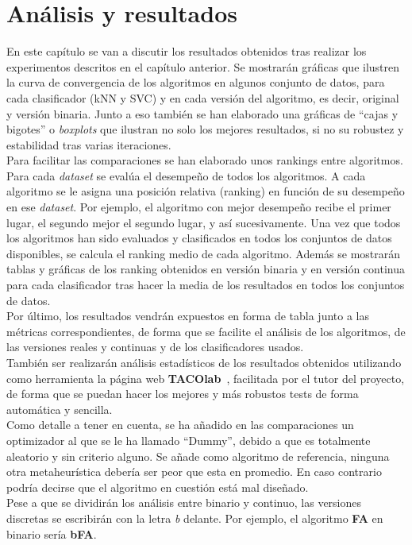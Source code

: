 \chapter{Análisis y resultados}
En este capítulo se van a discutir los resultados obtenidos tras realizar los experimentos descritos en el capítulo anterior. Se mostrarán gráficas que ilustren la curva de convergencia de los algoritmos en algunos conjunto de datos, para cada clasificador (kNN y SVC) y en cada versión del algoritmo, es decir, original y versión binaria. Junto a eso también se han elaborado una gráficas de ``cajas y bigotes'' o \textit{boxplots} que ilustran no solo los mejores resultados, si no su robustez y estabilidad tras varias iteraciones. \\[6pt]
Para facilitar las comparaciones se han elaborado unos rankings entre algoritmos. Para cada \textit{dataset} se evalúa el desempeño de todos los algoritmos. A cada algoritmo se le asigna una posición relativa (ranking) en función de su desempeño en ese \textit{dataset}. Por ejemplo, el algoritmo con mejor desempeño recibe el primer lugar, el segundo mejor el segundo lugar, y así sucesivamente. Una vez que todos los algoritmos han sido evaluados y clasificados en todos los conjuntos de datos disponibles, se calcula el ranking medio de cada algoritmo.
Además se mostrarán tablas y gráficas de los ranking obtenidos en versión binaria y en versión continua para cada clasificador tras hacer la media de los resultados en todos los conjuntos de datos.\\[6pt]
Por último, los resultados vendrán expuestos en forma de tabla junto a las métricas correspondientes, de forma que se facilite el análisis de los algoritmos, de las versiones reales y continuas y de los clasificadores usados.\\[6pt]
También ser realizarán análisis estadísticos de los resultados obtenidos utilizando como herramienta la página web \textbf{TACOlab}~\cite{taco_website}, facilitada por el tutor del proyecto, de forma que se puedan hacer los mejores y más robustos tests de forma automática y sencilla.\\[6pt]
Como detalle a tener en cuenta, se ha añadido en las comparaciones un optimizador al que se le ha llamado ``Dummy'', debido a que es totalmente aleatorio y sin criterio alguno. Se añade como algoritmo de referencia, ninguna otra metaheurística debería ser peor que esta en promedio. En caso contrario podría decirse que el algoritmo en cuestión está mal diseñado.\\[6pt]
Pese a que se dividirán los análisis entre binario y continuo, las versiones discretas se escribirán con la letra \textit{b} delante. Por ejemplo, el algoritmo \textbf{FA} en binario sería \textbf{bFA}.

